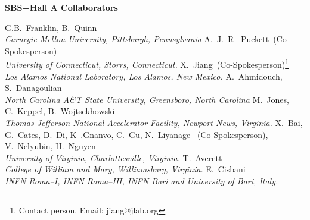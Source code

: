 
\centerline{\Large\bf SBS+Hall A Collaborators}
\vskip 0.3in

\begin{center}
\vskip 0.15in
G.B.~Franklin, B.~Quinn \\
 {\it Carnegie Mellon University, Pittsburgh, Pennsylvania} 
\vskip 0.15in
A.~J.~R ~Puckett~(Co-Spokesperson) \\
{\it University of Connecticut,  Storrs, Connecticut.}
%
\vskip 0.15in
X.~Jiang~(Co-Spokesperson)\footnote{Contact person. Email: jiang@jlab.org}  \\
 {\it  Los Alamos National Laboratory, Los Alamos, New Mexico.}
%
\vskip 0.15in
A.~Ahmidouch, S.~Danagoulian \\
{\it North Carolina A\&T State University, Greensboro, North Carolina}
%
\vskip 0.15in
M.~Jones, C.~Keppel,  B.~Wojtsekhowski  \\
{\it  Thomas Jefferson National Accelerator Facility, Newport News, Virginia.}
%
\vskip 0.15in
X.~Bai,  G.~Cates, D.~Di, K~.Gnanvo,  C.~Gu, N.~Liyanage ~(Co-Spokesperson), V.~Nelyubin, H.~Nguyen  \\ 
%  
{\it University of Virginia, Charlottesville, Virginia.}
%
\vskip 0.15in
T.~Averett \\
{\it  College of William and Mary, Williamsburg, Virginia.}
%
\vskip 0.15in
E.~Cisbani \\ 
{\it INFN Roma--I, INFN Roma--III, INFN Bari and University of Bari, Italy.}  
\end{center}
